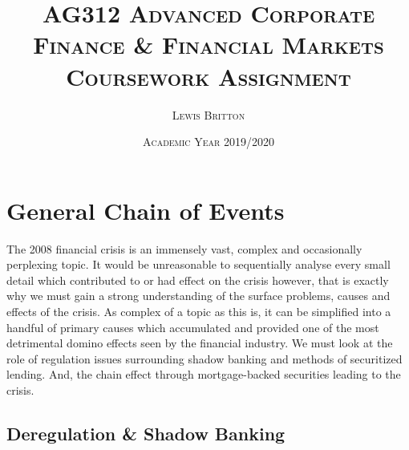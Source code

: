 \documentclass[11pt, english]{article}
\begin{document}

        \title{\textsc{AG312 Advanced Corporate Finance \& Financial Markets\\ Coursework Assignment}}
        \author{\textsc{Lewis Britton}}
        \date{\textsc{Academic Year 2019/2020}}
        \maketitle

\newpage


        \renewcommand{\contentsname}{Table of Contents}

        \tableofcontents

\newpage


\section{General Chain of Events}

	The 2008 financial crisis is an immensely vast, complex and occasionally perplexing topic. It would be unreasonable to sequentially analyse every small detail which contributed to or had effect on the crisis however, that is exactly why we must gain a strong understanding of the surface problems, causes and effects of the crisis. As complex of a topic as this is, it can be simplified into a handful of primary causes which accumulated and provided one of the most detrimental domino effects seen by the financial industry. We must look at the role of regulation issues surrounding shadow banking and methods of securitized lending. And, the chain effect through mortgage-backed securities leading to the crisis.

	\subsection{Deregulation \& Shadow Banking}
\end{document}
